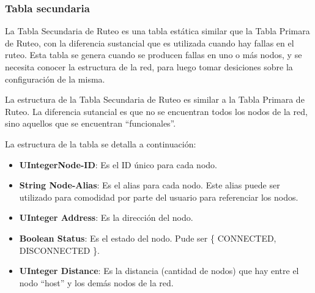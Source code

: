 \subsubsection{Tabla secundaria}
La Tabla Secundaria de Ruteo es una tabla estática similar que la Tabla Primara
de Ruteo, con la diferencia sustancial que es utilizada cuando hay fallas en el 
ruteo. Esta tabla se genera cuando se producen fallas en uno o más nodos, y se
necesita conocer la estructura de la red, para luego tomar desiciones sobre la
configuración de la misma.

La estructura de la Tabla Secundaria de Ruteo es similar a la Tabla Primara de
Ruteo. La diferencia sutancial es que no se encuentran todos los nodos de la
red, sino aquellos que se encuentran ``funcionales''.

La estructura de la tabla se detalla a continuación:
\begin{itemize}
\item \textbf{UIntegerNode-ID}: Es el ID único para cada nodo. 
\item \textbf{String Node-Alias}: Es el alias para cada nodo. Este alias puede
  ser utilizado para comodidad por parte del usuario para referenciar los nodos.
\item \textbf{UInteger Address}: Es la dirección del nodo.
\item \textbf{Boolean Status}: Es el estado del nodo. Pude ser \{ CONNECTED,
  DISCONNECTED \}.
\item \textbf{UInteger Distance}: Es la distancia (cantidad de nodos) que hay
  entre el nodo  ``host'' y los demás nodos de la red. 
\end{itemize}

